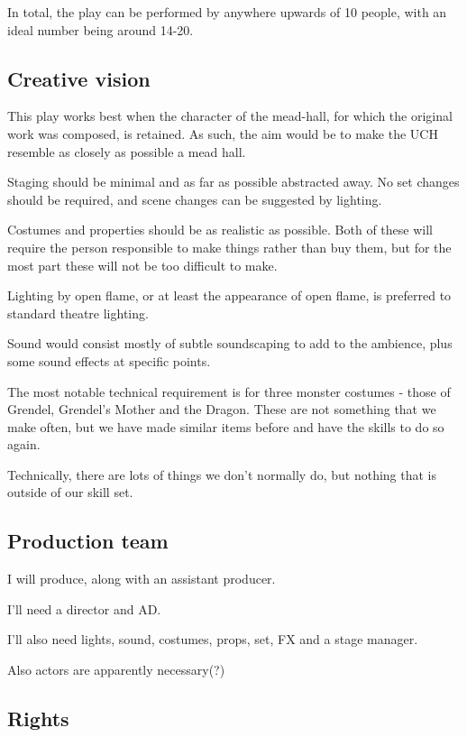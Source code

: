 \documentclass[a4paper]{article}
\begin{document}
In total, the play can be performed by anywhere upwards of 10 people, with an ideal number being around 14-20.

\newpage

\subsection{Creative vision}%

This play works best when the character of the mead-hall, for which the
original work was composed, is retained. As such, the aim would be to make the UCH
resemble as closely as possible a mead hall. 

Staging should be minimal and as far as possible abstracted away. No set changes 
should be required, and scene changes can be suggested by lighting. 

Costumes and properties should be as realistic as possible. Both of these will
require the person responsible to make things rather than buy them, but for the most
part these will not be too difficult to make.

Lighting by open flame, or at least the appearance of open flame, is preferred 
to standard theatre lighting.

Sound would consist mostly of subtle soundscaping to add to the ambience, plus some
sound effects at specific points.

The most notable technical requirement is for three monster costumes - those of
Grendel, Grendel's Mother and the Dragon. These are not something that we make 
often, but we have made similar items before and have the skills to do so again.

Technically, there are lots of things we don't normally do, but nothing that is 
outside of our skill set.

\subsection{Production team}%

I will produce, along with an assistant producer.

I'll need a director and AD.

I'll also need lights, sound, costumes, props, set, FX and a stage manager.

Also actors are apparently necessary(?)

\subsection{Rights}%
\end{document}
